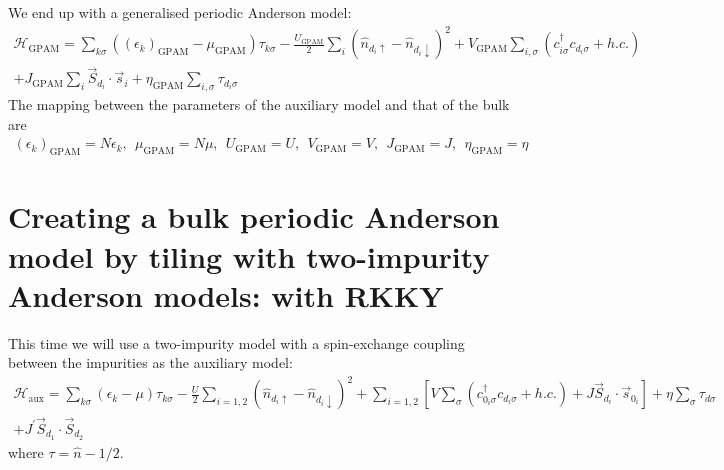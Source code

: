 \documentclass{report}
\numberwithin{equation}{section}
\begin{document}
We end up with a generalised periodic Anderson model:
\begin{equation}\begin{aligned}
	\mathcal{H}_\text{GPAM} = \sum_{k\sigma}\left(\left(\epsilon_k\right)_\text{GPAM} - \mu_\text{GPAM}\right)\tau_{k\sigma} - \frac{U_\text{GPAM}}{2}\sum_{i}\left(\hat n_{d_i \uparrow} - \hat n_{d_i \downarrow} \right) ^2 + V_\text{GPAM} \sum_{i,\sigma} \left(c^\dagger_{i\sigma} c_{d_i\sigma} + h.c.\right)\\
	+ J_\text{GPAM} \sum_i\vec{S}_{d_i}\cdot\vec{s}_i + \eta_\text{GPAM} \sum_{i,\sigma}\tau_{d_i\sigma}
\end{aligned}\end{equation}
The mapping between the parameters of the auxiliary model and that of the bulk are
\begin{equation}\begin{aligned}
	\label{map_pam_bulk}
	\left(\epsilon_k\right)_\text{GPAM} = N\epsilon_k, ~ ~ \mu_\text{GPAM} = N\mu, ~ ~ U_\text{GPAM} = U, ~ ~ V_\text{GPAM} = V, ~ ~ J_\text{GPAM} = J, ~ ~ \eta_\text{GPAM} = \eta
\end{aligned}\end{equation}

\section{Creating a bulk periodic Anderson model by tiling with two-impurity Anderson models: with RKKY}

This time we will use a two-impurity model with a spin-exchange coupling between the impurities as the auxiliary model:
\begin{equation}\begin{aligned}
	\mathcal{H}_\text{aux} = \sum_{k\sigma}\left(\epsilon_k - \mu\right)\tau_{k\sigma} - \frac{U}{2}\sum_{i=1,2}\left(\hat n_{d_i \uparrow} - \hat n_{d_i \downarrow} \right)^2 + \sum_{i=1,2}\left[V \sum_{\sigma} \left(c^\dagger_{0_i\sigma} c_{d_i\sigma} + h.c.\right) + J \vec{S}_{d_i}\cdot\vec{s}_{0_i}\right] + \eta \sum_\sigma\tau_{d\sigma}\\
 + J^\prime\vec{S}_{d_1}\cdot\vec{S}_{d_2}
\end{aligned}\end{equation}
where \(\tau = \hat n - 1/2\).
\end{document}
